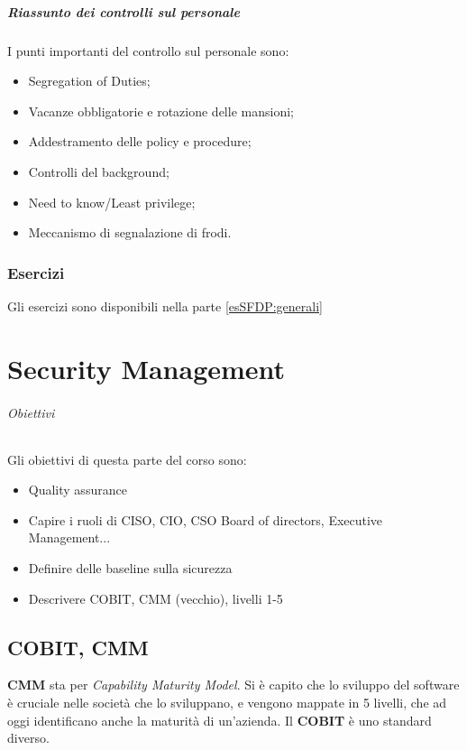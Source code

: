 \subsubsection{Riassunto dei controlli sul personale}

I punti importanti del controllo sul personale sono:
\begin{itemize}
\item Segregation of Duties;
\item Vacanze obbligatorie e rotazione delle mansioni;
\item Addestramento delle policy e procedure;
\item Controlli del background;
\item Need to know/Least privilege;
\item Meccanismo di segnalazione di frodi.
\end{itemize}

\section{Esercizi}

Gli esercizi sono disponibili nella parte \ref{esSFDP:generali}

\part{Security Management}
\label{SM}

\paragraph{Obiettivi}

Gli obiettivi di questa parte del corso sono:
\begin{itemize}
\item Quality assurance
\item Capire i ruoli di CISO, CIO, CSO Board of directors, Executive 
Management...
\item Definire delle baseline sulla sicurezza 
\item Descrivere COBIT, CMM (vecchio), livelli 1-5
\end{itemize}

\chapter{COBIT, CMM}

\textbf{CMM} sta per \textit{Capability Maturity Model}. Si è capito che lo 
sviluppo del software è cruciale nelle società che lo sviluppano, e vengono 
mappate in 5 livelli, che ad oggi identificano anche la maturità di un'azienda.
Il \textbf{COBIT} è uno standard diverso.

